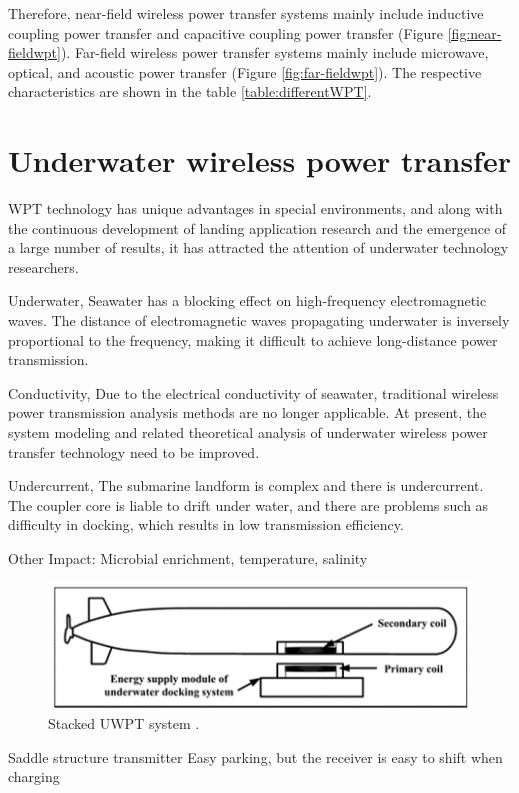 Therefore, near-field wireless power transfer systems mainly include inductive coupling power transfer and capacitive coupling power transfer (Figure \ref{fig:near-fieldwpt}). Far-field wireless power transfer systems mainly include microwave, optical, and acoustic power transfer (Figure \ref{fig:far-fieldwpt}).  The respective characteristics are shown in the table \ref{table:differentWPT}.


\section{Underwater wireless power transfer}
WPT technology has unique advantages in special environments, and along with the continuous development of landing application research and the emergence of a large number of results, it has attracted the attention of underwater technology researchers. 

Underwater,
Seawater has a blocking effect on high-frequency electromagnetic waves. The distance of electromagnetic waves propagating underwater is inversely proportional to the frequency, making it difficult to achieve long-distance power transmission.

Conductivity,
Due to the electrical conductivity of seawater, traditional wireless power transmission analysis methods are no longer applicable. At present, the system modeling and related theoretical analysis of underwater wireless power transfer technology need to be improved.

Undercurrent,
The submarine landform is complex and there is undercurrent. The coupler core is liable to drift under water, and there are problems such as difficulty in docking, which results in low transmission efficiency.

Other Impact:
Microbial enrichment, temperature, salinity

\begin{figure}[htbp]
    \centering
    \includegraphics[width=0.7\linewidth]{images/1_stacked_UWPT_system.png}
    \caption{Stacked UWPT system \cite{Song}.}
    \label{fig:stacked UWPT system}
\end{figure}

Saddle structure transmitter
Easy parking, but the receiver is easy to shift when charging


